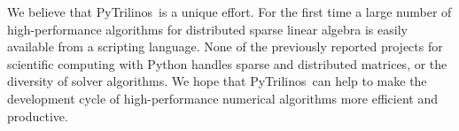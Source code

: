 \documentclass{llncs}
\newcommand{\PyTrilinos}{{\sc PyTrilinos}}
\begin{document}
We believe that \PyTrilinos\ is a unique effort. For the first time
a large number of high-performance algorithms for distributed sparse
linear algebra is easily available from a scripting language.  None
of the previously reported projects for scientific computing with
Python handles sparse and distributed matrices, or the diversity of
solver algorithms.  We hope that \PyTrilinos\ can help to make the
development cycle of high-performance numerical algorithms more
efficient and productive.



\end{document}

